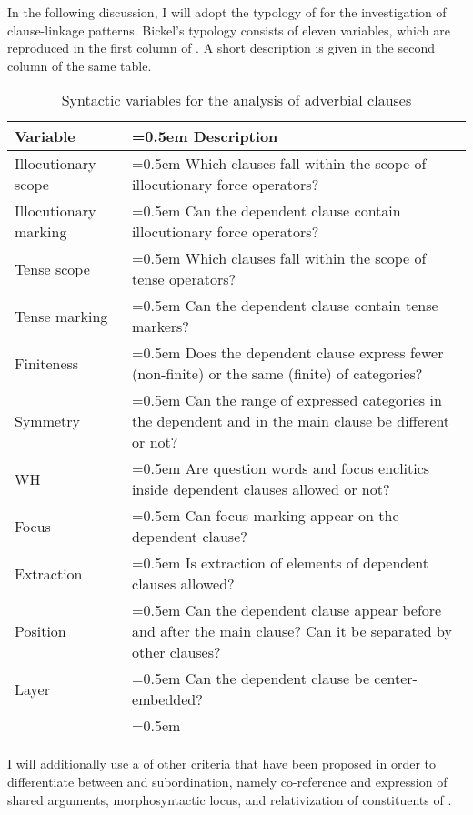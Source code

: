 In the following discussion, I will adopt the typology of \citet{Bickel2010} for the investigation of clause-linkage patterns. Bickel's typology consists of eleven variables, which are reproduced in the first column of . A short description is given in the second column of the same table. 
%
\begin{table}
	\caption{Syntactic variables for the analysis of adverbial clauses}
	\label{tab:Syntactic variables for the analysis of adverbial clauses}
	\small
	\begin{tabularx}{0.98\textwidth}[]{%
		>{\raggedright\arraybackslash}p{90pt}
		>{\raggedright\arraybackslash\hangindent=0.5em}X}
		
		\lsptoprule
			Variable			&	Description\\
		\midrule
			Illocutionary scope		&	Which clauses fall within the scope of illocutionary force operators?\\
			Illocutionary marking	&	Can the dependent clause contain illocutionary force operators?\\
			Tense scope			&	Which clauses fall within the scope of tense operators?\\
			Tense marking		&	Can the dependent clause contain tense markers?\\
			Finiteness			&	Does the dependent clause express fewer (non-finite) or the same \isit{number} (finite) of categories?\\
			Symmetry			&	Can the range of expressed categories in the dependent and in the main clause be different or not?\\
			WH				&	Are question words and focus enclitics inside dependent clauses allowed or not?\\
			Focus				&	Can focus marking appear on the dependent clause?\\
			Extraction			&	Is extraction of elements of dependent clauses allowed?\\
			Position			&	Can the dependent clause appear before and after the main clause? Can it be separated by other clauses?\\
			Layer				&	Can the dependent clause be center-embedded?\\
		\lspbottomrule
	\end{tabularx}
\end{table}

I will additionally use a  of other criteria that have been proposed in order to differentiate between  and subordination, namely co-reference and expression of shared arguments, morphosyntactic locus, and relativization of constituents of .

